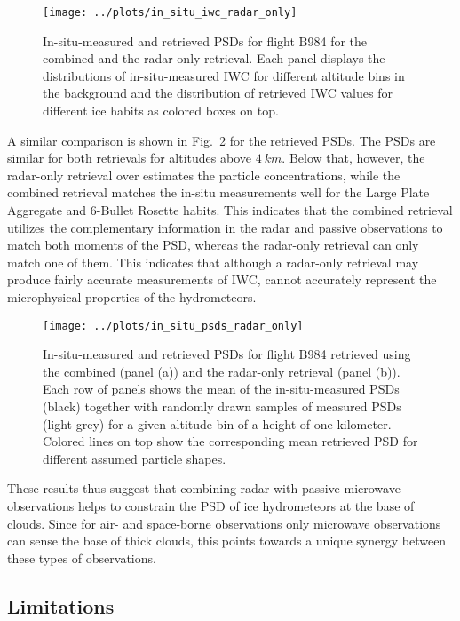 \documentclass[journal abbreviation, manuscript]{copernicus}
\begin{document}
\begin{figure}[!hbpt]
  \centering
  \texttt{[image: ../plots/in\_situ\_iwc\_radar\_only]}
  \caption{In-situ-measured and retrieved PSDs for flight B984
    for the combined and the radar-only retrieval. Each panel displays
    the distributions of in-situ-measured IWC for different altitude
    bins in the background and the distribution of retrieved IWC values
    for different ice habits as colored boxes on top.}
  \label{fig:in_situ_iwc_radar_only}
\end{figure}

A similar comparison is shown in Fig.~\ref{fig:in_situ_psds_radar_only} for the
retrieved PSDs. The PSDs are similar for both retrievals for altitudes above
$4\ \unit{km}$. Below that, however, the radar-only retrieval over estimates the
particle concentrations, while the combined retrieval matches the in-situ
measurements well for the Large Plate Aggregate and 6-Bullet Rosette habits.
This indicates that the combined retrieval utilizes the complementary
information in the radar and passive observations to match both moments of the
PSD, whereas the radar-only retrieval can only match one of them. This indicates
that although a radar-only retrieval may produce fairly accurate measurements
of IWC, cannot accurately represent the microphysical properties of the
hydrometeors.

\begin{figure}[!hbpt]
  \centering
  \texttt{[image: ../plots/in\_situ\_psds\_radar\_only]}
  \caption{In-situ-measured and retrieved PSDs for flight B984
    retrieved using the combined (panel (a)) and the radar-only retrieval
    (panel (b)). Each row of panels shows the mean of the in-situ-measured
    PSDs (black) together with randomly drawn samples of measured PSDs
    (light grey) for a given altitude bin of a height of one kilometer.
    Colored lines on top show the corresponding mean retrieved PSD for
    different assumed particle shapes.}
  \label{fig:in_situ_psds_radar_only}
\end{figure}

These results thus suggest that combining radar with passive microwave
observations helps to constrain the PSD of ice hydrometeors at the base of
clouds. Since for air- and space-borne observations only microwave observations
can sense the base of thick clouds, this points towards a unique synergy between
these types of observations.

\subsection{Limitations}
\end{document}
